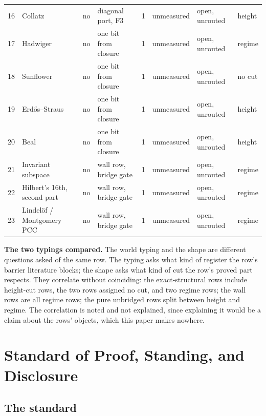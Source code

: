 \documentclass[10pt,twocolumn]{article}
\begin{document}
\begin{table}[!t]
\begin{tabularx}{\textwidth}{@{}P{0.02\textwidth} P{0.16\textwidth} P{0.05\textwidth} L P{0.04\textwidth} P{0.10\textwidth} P{0.13\textwidth} P{0.07\textwidth}@{}}
16 & Collatz & no & diagonal port, F3 & 1 & unmeasured & open, unrouted & height \\
17 & Hadwiger & no & one bit from closure & 1 & unmeasured & open, unrouted & regime \\
18 & Sunflower & no & one bit from closure & 1 & unmeasured & open, unrouted & no cut \\
19 & Erdős--Straus & no & one bit from closure & 1 & unmeasured & open, unrouted & height \\
20 & Beal & no & one bit from closure & 1 & unmeasured & open, unrouted & height \\
21 & Invariant subspace & no & wall row, bridge gate & 1 & unmeasured & open, unrouted & regime \\
22 & Hilbert's 16th, second part & no & wall row, bridge gate & 1 & unmeasured & open, unrouted & regime \\
23 & Lindelöf / Montgomery PCC & no & wall row, bridge gate & 1 & unmeasured & open, unrouted & regime \\
\bottomrule
\end{tabularx}
\end{table}

\textbf{The two typings compared.} The world typing and the shape are
different questions asked of the same row. The typing asks what kind of
register the row's barrier literature blocks; the shape asks what kind
of cut the row's proved part respects. They correlate without
coinciding: the exact-structural rows include height-cut rows, the two
rows assigned no cut, and two regime rows; the wall rows are all regime
rows; the pure unbridged rows split between height and regime. The
correlation is noted and not explained, since explaining it would be a
claim about the rows' objects, which this paper makes nowhere.

\hypertarget{standard-of-proof-standing-and-disclosure}{%
\section{Standard of Proof, Standing, and
Disclosure}\label{standard-of-proof-standing-and-disclosure}}

\hypertarget{the-standard}{%
\subsection{The standard}\label{the-standard}}
\end{document}
